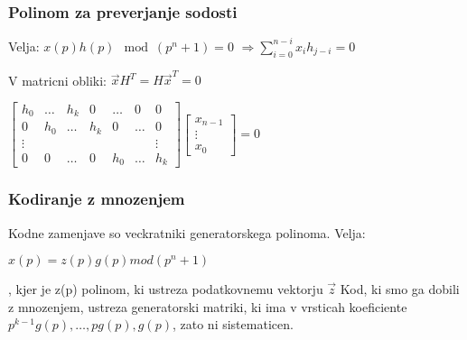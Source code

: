 \documentclass{article}
\begin{document}
\begin{multicols}{4}
\subsubsection{Polinom za preverjanje sodosti}
Velja: $x(p)h(p) \mod(p^n + 1) = 0$ $\Rightarrow \sum_{i=0}^{n-i} x_i h_{j-i} = 0$

V matricni obliki: $\vec{x} H^T = H\vec{x}^T = 0$
\begin{center}
    \begin{tiny}
        \begin{math}
            \begin{bmatrix}
                h_0 & \dots & h_k & 0 & \dots & 0 & 0\\
                0 & h_0 & \dots & h_k & 0 & \dots & 0 \\
                \vdots & & & & & & \vdots \\
                0 & 0 & \dots & 0 & h_0 & \dots & h_k
            \end{bmatrix}
            \begin{bmatrix}
                x_{n-1}\\
                \vdots\\
                x_0
            \end{bmatrix} = 0
        \end{math}
    \end{tiny}
\end{center}

\subsubsection{Kodiranje z mnozenjem}
Kodne zamenjave so veckratniki generatorskega polinoma.
Velja:
\begin{center}
    \begin{math}
        x(p) = z(p) g(p) mod (p^n + 1)
    \end{math}
\end{center}, kjer je z(p) polinom, ki ustreza podatkovnemu vektorju $\vec{z}$
Kod, ki smo ga dobili z mnozenjem, ustreza generatorski matriki, ki ima v vrsticah
koeficiente $p^{k-1}g(p), \dots, pg(p), g(p)$, zato ni sistematicen.


\end{multicols}
\end{document}
